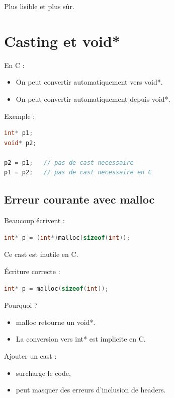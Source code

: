 Plus lisible et plus sûr.

\section{Casting et void*}

En C :

\begin{itemize}
\item On peut convertir automatiquement vers void*.
\item On peut convertir automatiquement depuis void*.
\end{itemize}

Exemple :

\begin{lstlisting}[language=C]
int* p1;
void* p2;

p2 = p1;   // pas de cast necessaire
p1 = p2;   // pas de cast necessaire en C
\end{lstlisting}

\subsection{Erreur courante avec malloc}

Beaucoup écrivent :

\begin{lstlisting}[language=C]
int* p = (int*)malloc(sizeof(int));
\end{lstlisting}

Ce cast est inutile en C.

Écriture correcte :

\begin{lstlisting}[language=C]
int* p = malloc(sizeof(int));
\end{lstlisting}

Pourquoi ?

\begin{itemize}
\item malloc retourne un void*.
\item La conversion vers int* est implicite en C.
\end{itemize}

Ajouter un cast :

\begin{itemize}
\item surcharge le code,
\item peut masquer des erreurs d’inclusion de headers.
\end{itemize}
